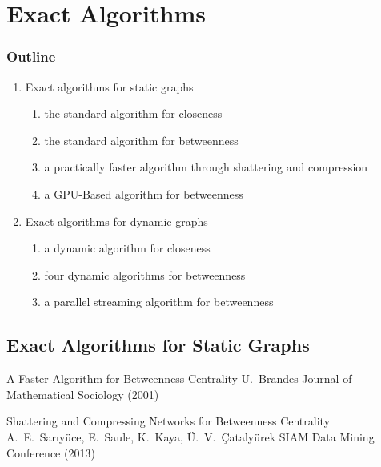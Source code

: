 
\section{Exact Algorithms}
\begin{frame}
  \frametitle{Outline}
  \begin{enumerate}
    \item Exact algorithms for static graphs
      \begin{enumerate}
        \item the standard algorithm for closeness
        \item the standard algorithm for betweenness
        \item a practically faster algorithm through shattering and compression
        \item a GPU-Based algorithm for betweenness
      \end{enumerate}
    \item Exact algorithms for dynamic graphs
      \begin{enumerate}
        \item a dynamic algorithm for closeness
        \item four dynamic algorithms for betweenness
        \item a parallel streaming algorithm for betweenness
      \end{enumerate}
  \end{enumerate}
\end{frame}

\subsection{Exact Algorithms for Static Graphs}

\begin{frame}
  \centering
  \vfill
  {\Huge A Faster Algorithm for Betweenness Centrality}
  \vfill
  {\Large U.~Brandes}
  \vfill
  {\large Journal of Mathematical Sociology (2001)}
  \vfill
\end{frame}

\begin{frame}
  \centering
  \vfill
  {\huge Shattering and Compressing Networks for Betweenness Centrality}
  \vfill
  {\Large A.~E.~Sar\i y\"uce, E.~Saule, K.~Kaya, \"U.~V.~\c{C}ataly\"urek}
  \vfill
  {\large SIAM Data Mining Conference (2013)}
  \vfill
\end{frame}

